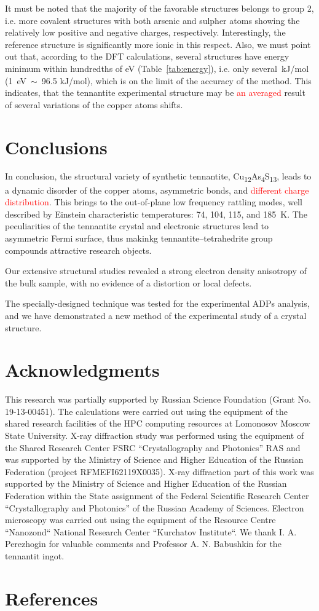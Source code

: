\documentclass[preprint,review,12pt]{elsarticle}
\begin{document}
It must be noted that the majority of the favorable structures belongs to group 2, i.e. more covalent structures with both arsenic and sulpher atoms showing the relatively low positive and negative charges, respectively.
Interestingly, the reference structure is significantly more ionic in this respect.
Also, we must point out that, according to the DFT calculations, several structures have energy minimum within hundredths of eV (Table~\ref{tab:energy}), i.e. only several~kJ/mol (1~eV~$\sim$~96.5 kJ/mol), which is on the limit of the accuracy of the method.
This indicates, that the tennantite experimental structure may be \textcolor{red}{an averaged} result of several variations of the copper atoms shifts.


\section{Conclusions}\label{sec:level1}
In conclusion, the structural variety of synthetic tennantite, Cu\textsubscript{12}As\textsubscript{4}S\textsubscript{13},  leads to  a dynamic disorder of the copper atoms, asymmetric bonds, and \textcolor{red}{different charge distribution}.
This brings to the out-of-plane low frequency rattling modes, well described by Einstein characteristic temperatures: 74, 104, 115, and 185~K.
The peculiarities of the tennantite crystal and electronic structures lead to asymmetric Fermi surface, thus makinkg tennantite--tetrahedrite group compounds attractive research objects.

Our extensive structural studies revealed a strong electron density anisotropy of the bulk sample, with no evidence of a distortion or local defects.

The specially-designed  technique was tested for the experimental ADPs analysis, and we have demonstrated a new method of the experimental study of a crystal structure.

\section{Acknowledgments}\label{sec:level1}
This research was partially supported by Russian Science Foundation (Grant No. 19-13-00451). The calculations were carried out using the equipment of the shared research facilities of the HPC computing resources at Lomonosov Moscow State University.
X-ray diffraction study was performed using the equipment of the Shared Research Center FSRC “Crystallography and Photonics” RAS and was supported by the Ministry of  Science and Higher Education of the Russian Federation (project RFMEFI62119X0035). X-ray diffraction part of this work was supported by the Ministry of Science and Higher Education of the Russian Federation within the State assignment  of the Federal Scientific Research Center “Crystallography and Photonics” of the Russian Academy of Sciences.
Electron microscopy was carried out using the equipment of the Resource Centre “Nanozond“
National Research Center “Kurchatov Institute“.
We thank I. A. Perezhogin for valuable comments and  Professor A. N. Babushkin for the tennantit ingot.


\section{References}\label{sec:level1}


\end{document}
